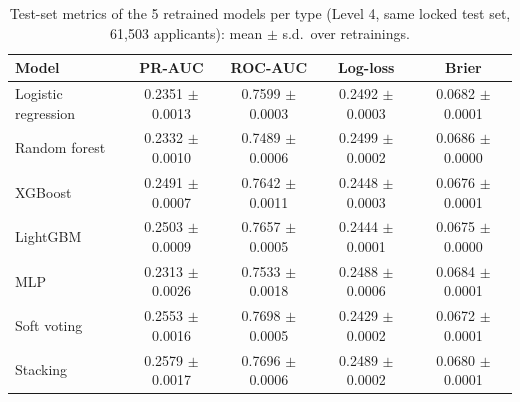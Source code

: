 \begin{table}[t]
\caption{Test-set metrics of the 5 retrained models per type (Level 4, same locked test set, 61,503 applicants): mean $\pm$ s.d.\ over retrainings.}
\label{tab:rq3_refit_metrics}
\centering
\small
\begin{tabular}{lcccc}
\hline
Model & PR-AUC & ROC-AUC & Log-loss & Brier \\
\hline
Logistic regression & 0.2351 $\pm$ 0.0013 & 0.7599 $\pm$ 0.0003 & 0.2492 $\pm$ 0.0003 & 0.0682 $\pm$ 0.0001 \\
Random forest & 0.2332 $\pm$ 0.0010 & 0.7489 $\pm$ 0.0006 & 0.2499 $\pm$ 0.0002 & 0.0686 $\pm$ 0.0000 \\
XGBoost & 0.2491 $\pm$ 0.0007 & 0.7642 $\pm$ 0.0011 & 0.2448 $\pm$ 0.0003 & 0.0676 $\pm$ 0.0001 \\
LightGBM & 0.2503 $\pm$ 0.0009 & 0.7657 $\pm$ 0.0005 & 0.2444 $\pm$ 0.0001 & 0.0675 $\pm$ 0.0000 \\
MLP & 0.2313 $\pm$ 0.0026 & 0.7533 $\pm$ 0.0018 & 0.2488 $\pm$ 0.0006 & 0.0684 $\pm$ 0.0001 \\
Soft voting & 0.2553 $\pm$ 0.0016 & 0.7698 $\pm$ 0.0005 & 0.2429 $\pm$ 0.0002 & 0.0672 $\pm$ 0.0001 \\
Stacking & 0.2579 $\pm$ 0.0017 & 0.7696 $\pm$ 0.0006 & 0.2489 $\pm$ 0.0002 & 0.0680 $\pm$ 0.0001 \\
\hline
\end{tabular}
\end{table}